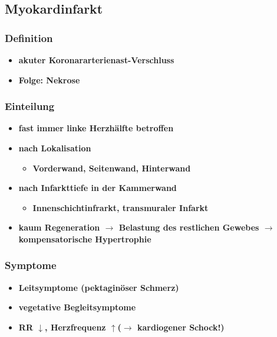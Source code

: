 	\subsection*{Myokardinfarkt}
		\subsubsection*{Definition}
			\begin{itemize}
				\item \textbf{akuter Koronararterienast-Verschluss}
				\item \textbf{Folge: Nekrose}
			\end{itemize}
		\subsubsection*{Einteilung}
			\begin{itemize}
				\item \textbf{fast immer linke Herzhälfte betroffen}
				\item \textbf{nach Lokalisation}
					\begin{itemize}
						\item \textbf{Vorderwand, Seitenwand, Hinterwand}
					\end{itemize}
				\item \textbf{nach Infarkttiefe in der Kammerwand}
					\begin{itemize}
						\item \textbf{Innenschichtinfrarkt, transmuraler Infarkt}
					\end{itemize}
				\item \textbf{kaum Regeneration $\rightarrow$ Belastung des restlichen Gewebes $\rightarrow$ kompensatorische Hypertrophie}
			\end{itemize}
		\subsubsection*{Symptome}
			\begin{itemize}
				\item \textbf{Leitsymptome (pektaginöser Schmerz)}
				\item \textbf{vegetative Begleitsymptome}
				\item \textbf{RR $\downarrow$, Herzfrequenz $\uparrow$($\rightarrow$ kardiogener Schock!)}
			\end{itemize}

